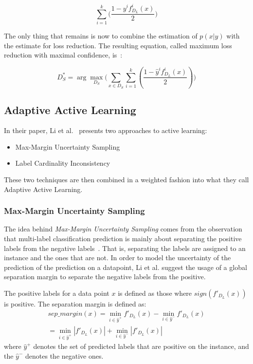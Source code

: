 \begin{equation}
    \sum_{i=1}^k\big ( \frac{1 - y^if^i_{D_L}(x)}{2} \big )
\end{equation}

The only thing that remains is now to combine the estimation of $p(x|y)$ with the estimate for loss reduction.
The resulting equation, called maximum loss reduction with maximal confidence, is~\cite{yang2009effective}:

\begin{equation}
    D^*_S = \arg \max_{D_S} \big ( \sum_{x \in D_S} \sum_{i=1}^k (\frac{1 - \hat{y}^if^i_{D_L}(x)}{2}) \big )
\end{equation}

\subsection{Adaptive Active Learning}\label{subsec:adaptive-active-learning}

In their paper, Li et al\@.~\cite{li2013active} presents two approaches to active learning:
\begin{itemize}
    \item Max-Margin Uncertainty Sampling
    \item Label Cardinality Inconsistency 
\end{itemize}
These two techniques are then combined in a weighted fashion into what they call Adaptive Active Learning.

\subsubsection{Max-Margin Uncertainty Sampling}

The idea behind \textit{Max-Margin Uncertainty Sampling} comes from the observation that multi-label classification prediction is mainly about separating the positive labels from the negative labels~\cite{li2013active}.
That is, separating the labels are assigned to an instance and the ones that are not.
In order to model the uncertainty of the prediction of the prediction on a datapoint, Li et al\@. suggest the usage of a global separation margin to separate the negative labels from the positive.

The positive labels for a data point $x$ is defined as those where $sign(f'_{D_L}(x))$ is positive.
The separation margin is defined as:
\begin{equation}
    \begin{split}
        sep\_margin(x) = \min_{i \in \hat{y}^+}f'_{D_L}(x) - \min_{i \in \hat{y}^-}f'_{D_L}(x) \\
        = \min_{i \in \hat{y}^+}|f'_{D_L}(x)| + \min_{i \in \hat{y}^-}|f'_{D_L}(x)|
    \end{split}
\end{equation}
where $\hat{y}^+$ denotes the set of predicted labels that are positive on the instance, and the $\hat{y}^-$ denotes the negative ones.

